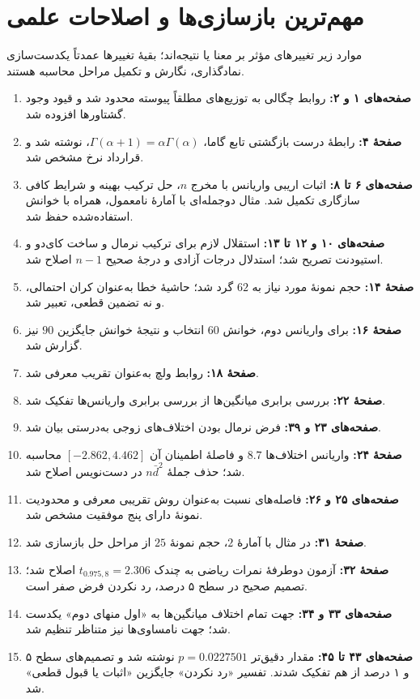 \documentclass[12pt,a4paper,oneside]{report}
\newcounter{ex}[chapter]
\begin{document}
\section{مهم‌ترین بازسازی‌ها و اصلاحات علمی}
موارد زیر تغییرهای مؤثر بر معنا یا نتیجه‌اند؛ بقیهٔ تغییرها عمدتاً یکدست‌سازی نمادگذاری، نگارش و تکمیل مراحل محاسبه هستند.
\begin{enumerate}\small\setlength{\itemsep}{2pt}\setlength{\parsep}{0pt}
\item \textbf{صفحه‌های ۱ و ۲:} روابط چگالی به توزیع‌های مطلقاً پیوسته محدود شد و قیود وجود گشتاورها افزوده شد.
\item \textbf{صفحهٔ ۴:} رابطهٔ درست بازگشتی تابع گاما، $\Gamma(\alpha+1)=\alpha\Gamma(\alpha)$، نوشته شد و قرارداد نرخ مشخص شد.
\item \textbf{صفحه‌های ۶ تا ۸:} اثبات اریبی واریانس با مخرج $n$، حل ترکیب بهینه و شرایط کافی سازگاری تکمیل شد. مثال دوجمله‌ای با آمارهٔ نامعمول، همراه با خوانش استفاده‌شده حفظ شد.
\item \textbf{صفحه‌های ۱۰ و ۱۲ تا ۱۳:} استقلال لازم برای ترکیب نرمال و ساخت کای‌دو و استیودنت تصریح شد؛ استدلال درجات آزادی و درجهٔ صحیح $n-1$ اصلاح شد.
\item \textbf{صفحهٔ ۱۴:} حجم نمونهٔ مورد نیاز به $62$ گرد شد؛ حاشیهٔ خطا به‌عنوان کران احتمالی، و نه تضمین قطعی، تعبیر شد.
\item \textbf{صفحهٔ ۱۶:} برای واریانس دوم، خوانش $60$ انتخاب و نتیجهٔ خوانش جایگزین $90$ نیز گزارش شد.
\item \textbf{صفحهٔ ۱۸:} روابط ولچ به‌عنوان تقریب معرفی شد.
\item \textbf{صفحهٔ ۲۲:} بررسی برابری میانگین‌ها از بررسی برابری واریانس‌ها تفکیک شد.
\item \textbf{صفحه‌های ۲۳ و ۳۹:} فرض نرمال بودن اختلاف‌های زوجی به‌درستی بیان شد.
\item \textbf{صفحهٔ ۲۴:} واریانس اختلاف‌ها $8.7$ و فاصلهٔ اطمینان آن $[-2.862,4.462]$ محاسبه شد؛ حذف جملهٔ $n\bar d^2$ در دست‌نویس اصلاح شد.
\item \textbf{صفحه‌های ۲۵ و ۲۶:} فاصله‌های نسبت به‌عنوان روش تقریبی معرفی و محدودیت نمونهٔ دارای پنج موفقیت مشخص شد.
\item \textbf{صفحهٔ ۳۱:} در مثال با آمارهٔ $2$، حجم نمونهٔ $25$ از مراحل حل بازسازی شد.
\item \textbf{صفحهٔ ۳۲:} آزمون دوطرفهٔ نمرات ریاضی به چندک $t_{0.975,8}=2.306$ اصلاح شد؛ تصمیم صحیح در سطح ۵ درصد، رد نکردن فرض صفر است.
\item \textbf{صفحه‌های ۳۳ و ۳۴:} جهت تمام اختلاف میانگین‌ها به «اول منهای دوم» یکدست شد؛ جهت نامساوی‌ها نیز متناظر تنظیم شد.
\item \textbf{صفحه‌های ۴۳ تا ۴۵:} مقدار دقیق‌تر $p=0.0227501$ نوشته شد و تصمیم‌های سطح ۵ و ۱ درصد از هم تفکیک شدند. تفسیر «رد نکردن» جایگزین «اثبات یا قبول قطعی» شد.
\end{enumerate}
\clearpage
\end{document}
